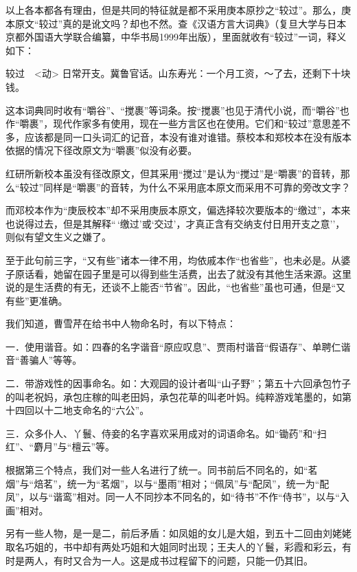 以上各本都各有理由，但是共同的特征就是都不采用庚本原抄之``较过''。那么，庚本原文``较过''真的是讹文吗？却也不然。查《汉语方言大词典》（复旦大学与日本京都外国语大学联合编纂，中华书局1999年出版），里面就收有``较过''一词，释义如下：

较过　\textless{}动\textgreater{}
日常开支。冀鲁官话。山东寿光：一个月工资，～了去，还剩下十块钱。

这本词典同时收有``嚼谷''、``搅裹''等词条。按``搅裹''也见于清代小说，而``嚼谷''也作``嚼裹''，现代作家多有使用，现在一些方言区也在使用。它们和``较过''意思差不多，应该都是同一口头词汇的记音，本没有谁对谁错。蔡校本和郑校本在没有版本依据的情况下径改原文为``嚼裹''似没有必要。

红研所新校本虽没有径改原文，但其采用``搅过''是认为``搅过''是``嚼裹''的音转，那么``较过''同样是``嚼裹''的音转，为什么不采用底本原文而采用不可靠的旁改文字？

而邓校本作为``庚辰校本''却不采用庚辰本原文，偏选择较次要版本的``缴过''，本来也说得过去，但是其解释``\,`缴过'或`交过'，才真正含有交纳支付日用开支之意''，则似有望文生义之嫌了。

至于此句前三字，``又有些''诸本一律不用，均依戚本作``也省些''，也未必是。从婆子原话看，她留在园子里是可以得到些生活费，出去了就没有其他生活来源。这里说的是生活费的有无，还谈不上能否``节省''。因此，``也省些''虽也可通，但是``又有些''更准确。

{{}}

我们知道，曹雪芹在给书中人物命名时，有以下特点：

一．使用谐音。如：四春的名字谐音``原应叹息''、贾雨村谐音``假语存''、单聘仁谐音``善骗人''等等。

二．带游戏性的因事命名。如：大观园的设计者叫``山子野''；第五十六回承包竹子的叫老祝妈，承包庄稼的叫老田妈，承包花草的叫老叶妈。纯粹游戏笔墨的，如第十四回以十二地支命名的``六公''。

三．众多仆人、丫鬟、侍妾的名字喜欢采用成对的词语命名。如``锄药''和``扫红''、``麝月''与``檀云''等。

根据第三个特点，我们对一些人名进行了统一。同书前后不同名的，如``茗烟''与``焙茗''，统一为``茗烟''，以与``墨雨''相对；``佩凤''与``配凤''，统一为``配凤''，以与``谐鸾''相对。同一人不同抄本不同名的，如``待书''不作``侍书''，以与``入画''相对。

另有一些人物，是一是二，前后矛盾：如凤姐的女儿是大姐，到五十二回由刘姥姥取名巧姐的，书中却有两处巧姐和大姐同时出现；王夫人的丫鬟，彩霞和彩云，有时是两人，有时又合为一人。这是成书过程留下的问题，只能一仍其旧。

